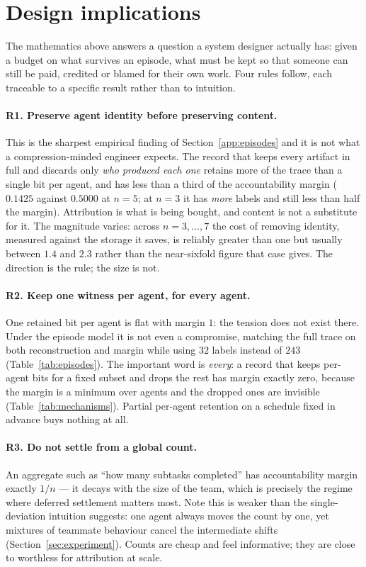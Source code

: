 \section{Design implications}
\label{app:design}

The mathematics above answers a question a system designer actually has: given a
budget on what survives an episode, what must be kept so that someone can still
be paid, credited or blamed for their own work. Four rules follow, each traceable
to a specific result rather than to intuition.

\paragraph{R1. Preserve agent identity before preserving content.}
This is the sharpest empirical finding of Section~\ref{app:episodes} and it is
not what a compression-minded engineer expects. The record that keeps every
artifact in full and discards only \emph{who produced each one} retains more of
the trace than a single bit per agent, and has less than a third of the
accountability margin ($0.1425$ against $0.5000$ at $n=5$; at $n = 3$ it has
\emph{more} labels and still less than half the margin). Attribution is what is
being bought, and content is not a substitute for it. The magnitude varies: across
$n = 3,\dots,7$ the cost of removing identity, measured against the storage it
saves, is reliably greater than one but usually between $1.4$ and $2.3$ rather
than the near-sixfold figure that case gives. The direction is the rule; the
size is not.

\paragraph{R2. Keep one witness per agent, for every agent.}
One retained bit per agent is flat with margin $1$: the tension does not exist
there. Under the episode model it is not even a compromise, matching the full
trace on both reconstruction and margin while using $32$ labels instead of $243$
(Table~\ref{tab:episodes}). The important word is \emph{every}: a record that
keeps per-agent bits for a fixed subset and drops the rest has margin exactly
zero, because the margin is a minimum over agents and the dropped ones are
invisible (Table~\ref{tab:mechanisms}). Partial per-agent retention on a schedule
fixed in advance buys nothing at all.

\paragraph{R3. Do not settle from a global count.}
An aggregate such as ``how many subtasks completed'' has accountability margin
exactly $1/n$ --- it decays with the size of the team, which is precisely the
regime where deferred settlement matters most. Note this is weaker than the
single-deviation intuition suggests: one agent always moves the count by one, yet
mixtures of teammate behaviour cancel the intermediate shifts
(Section~\ref{sec:experiment}). Counts are cheap and feel informative; they are
close to worthless for attribution at scale.

